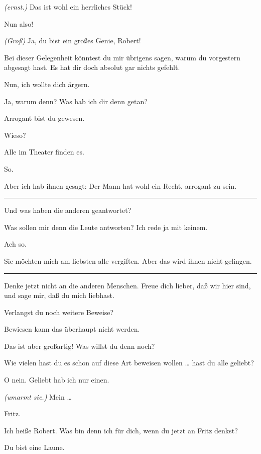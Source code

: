 \documentclass[
	final,
	a4paper,
	ngerman,
	mpinclude = true, %
	twoside = true,
	open = right,
	cleardoublepage = plain,
	DIV = 13,
	BCOR = 1cm,
	titlepage = firstiscover,
	]{scrbook}
\newcommand{\direction}[1]{\textit{(#1)}}
\newenvironment{deletion}{%
		\vspace{0.25\baselineskip}
		\hrule
		\vspace{0.25\baselineskip}
		\color{darkgray}
	}{
		\color{black}
		\vspace{0.25\baselineskip}
		\hrule 
		\vspace{0.25\baselineskip}
	}
\newcommand{\thecharacter}[1]{\textup{\textsc{#1}}\xspace}
\newcommand{\thedichter}{\thecharacter{Robert Bibitz}}
\newcommand{\theschauspielerin}{\thecharacter{Daniela}}
\newcommand{\character}[1]{\item[#1:]}
\newcommand{\dichter}{\character{\thedichter}}
\newcommand{\schauspielerin}{\character{\theschauspielerin}}
\begin{document}
\begin{play}
	\schauspielerin
	\direction{ernst.} Das ist wohl ein herrliches Stück!

	\dichter
	Nun also!

	\schauspielerin
	\direction{Groß} Ja, du bist ein großes Genie, Robert!

	\dichter
	Bei dieser Gelegenheit könntest du mir übrigens sagen, warum du vorgestern abgesagt hast. Es hat dir doch absolut gar nichts gefehlt.

	\schauspielerin
	Nun, ich wollte dich ärgern.

	\dichter
	Ja, warum denn? Was hab ich dir denn getan?

	\schauspielerin
	Arrogant bist du gewesen.

	\dichter
	Wieso?

	\schauspielerin
	Alle im Theater finden es.

	\dichter
	So.

	\schauspielerin
	Aber ich hab ihnen gesagt: Der Mann hat wohl ein Recht, arrogant zu sein.

	\begin{deletion}
	\dichter
	Und was haben die anderen geantwortet?

	\schauspielerin
	Was sollen mir denn die Leute antworten? Ich rede ja mit keinem.

	\dichter
	Ach so.

	\schauspielerin
	Sie möchten mich am liebsten alle vergiften. Aber das wird ihnen nicht gelingen.
	\end{deletion}

	\dichter
	Denke jetzt nicht an die anderen Menschen. Freue dich lieber, daß wir hier sind, und sage mir, daß du mich liebhast.

	\schauspielerin
	Verlangst du noch weitere Beweise?

	\dichter
	Bewiesen kann das überhaupt nicht werden.

	\schauspielerin
	Das ist aber großartig! Was willst du denn noch?

	\dichter
	Wie vielen hast du es schon auf diese Art beweisen wollen \ldots{} hast du alle geliebt?

	\schauspielerin
	O nein. Geliebt hab ich nur einen.

	\dichter
	\direction{umarmt sie.} Mein \ldots{}

	\schauspielerin
	Fritz.

	\dichter
	Ich heiße Robert. Was bin denn ich für dich, wenn du jetzt an Fritz denkst?

	\schauspielerin
	Du bist eine Laune.


\end{play}
\end{document}
